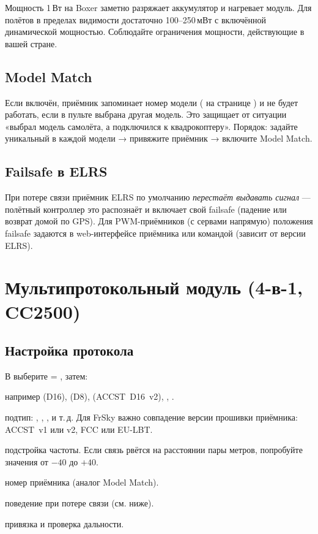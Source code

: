 \begin{tip}
Мощность 1\,Вт на Boxer заметно разряжает аккумулятор и нагревает модуль. Для полётов в
пределах видимости достаточно 100--250\,мВт с включённой динамической мощностью.
Соблюдайте ограничения мощности, действующие в вашей стране.
\end{tip}

\subsection{Model Match}

Если  включён, приёмник запоминает номер модели ( на
странице ) и не будет работать, если в пульте выбрана другая модель. Это защищает
от ситуации «выбрал модель самолёта, а подключился к квадрокоптеру». Порядок: задайте
уникальный  в каждой модели → привяжите приёмник → включите Model Match.

\subsection{Failsafe в ELRS}

При потере связи приёмник ELRS по умолчанию \emph{перестаёт выдавать сигнал} --- полётный
контроллер это распознаёт и включает свой failsafe (падение или возврат домой по GPS).
Для PWM-приёмников (с сервами напрямую) положения failsafe задаются в web-интерфейсе
приёмника или командой  (зависит от версии ELRS).

\section{Мультипротокольный модуль (4-в-1, CC2500)}

\subsection{Настройка протокола}

В  выберите  = , затем:

\begin{description}[font=\sffamily\bfseries\color{etx}]
  \item[Protocol] например  (D16),  (D8), 
        (ACCST~D16~v2), , .
  \item[Subtype] подтип: , , ,  и т.\,д.
        Для FrSky важно совпадение версии прошивки приёмника: ACCST~v1 или v2, FCC или EU-LBT.
  \item[RF Freq. fine tune] подстройка частоты. Если связь рвётся на расстоянии пары метров,
        попробуйте значения от $-40$ до $+40$.
  \item[Receiver No.] номер приёмника (аналог Model Match).
  \item[Failsafe] поведение при потере связи (см. ниже).
  \item[Bind / Range] привязка и проверка дальности.
\end{description}

